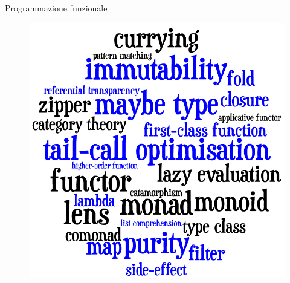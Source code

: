 \begin{frame}{Programmazione funzionale}
	\begin{figure}
		\hspace*{-8cm}
		\includegraphics[scale=0.1]{res/functional}
	\end{figure}

\end{frame}